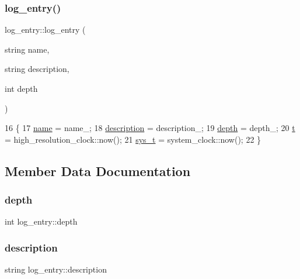 \subsubsection{\texorpdfstring{log\+\_\+entry()}{log\_entry()}}
{\footnotesize\ttfamily log\+\_\+entry\+::log\+\_\+entry (\begin{DoxyParamCaption}\item[{string}]{name,  }\item[{string}]{description,  }\item[{int}]{depth }\end{DoxyParamCaption})}


\begin{DoxyCode}
16                                                                  \{
17   \hyperlink{classlog__entry_ac65943b778a5978a579d984a6b682def}{name} = name\_;
18   \hyperlink{classlog__entry_a35acb4013a550dd9926c6cccd93300dd}{description} = description\_;
19   \hyperlink{classlog__entry_abfcc98c447997da2eb424a73f5f06da4}{depth} = depth\_;
20   \hyperlink{classlog__entry_a9477b6872dfa3609db1e4e6a97ed5dba}{t} = high\_resolution\_clock::now();
21   \hyperlink{classlog__entry_a2877798c71ba0f0762b821633c8bc517}{sys\_t} = system\_clock::now();
22 \}
\end{DoxyCode}


\subsection{Member Data Documentation}
\mbox{\label{classlog__entry_abfcc98c447997da2eb424a73f5f06da4}} 
\subsubsection{\texorpdfstring{depth}{depth}}
{\footnotesize\ttfamily int log\+\_\+entry\+::depth}

\mbox{\label{classlog__entry_a35acb4013a550dd9926c6cccd93300dd}} 
\subsubsection{\texorpdfstring{description}{description}}
{\footnotesize\ttfamily string log\+\_\+entry\+::description}

